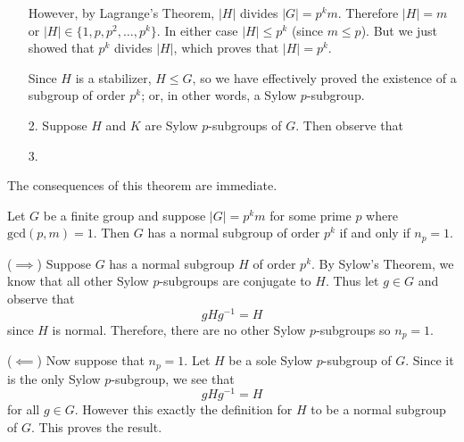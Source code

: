 \begin{prf}
\begin{itemize}
            However, by Lagrange's Theorem, $|H|$ divides $|G| =
            p^km$. Therefore $|H| = m$ or $|H| \in \{1, p, p^2, \dots,
            p^k\}$. In either case $|H| \le p^k$ (since $m \le p$).
            But we just showed that $p^k$ divides $|H|$, which proves
            that $|H| = p^k$. 
            
            Since $H$ is a stabilizer, $H \le G$, so
            we have effectively proved the existence of a subgroup of
            order $p^k$; or, in other words, a Sylow $p$-subgroup. 

        \item[2.]
            Suppose $H$ and $K$ are Sylow $p$-subgroups of $G$. 
            Then observe that 

        \item[3.] 
            


            
        \end{itemize}
    \end{prf}

    The consequences of this theorem are immediate. 
    \begin{proposition}\label{sylow_normal}
        Let $G$ be a finite group and suppose $|G| = p^km$ for some
        prime $p$ where $\mbox{gcd}(p, m) = 1$. Then $G$ has a normal
        subgroup of order $p^k$ if and only if $n_p = 1$.
    \end{proposition}

    \begin{prf}
        ($\implies$) Suppose $G$ has a normal subgroup $H$ of order $p^k$. By
        Sylow's Theorem, we know that all 
        other Sylow $p$-subgroups are conjugate to $H$. Thus let $g
        \in G$ and observe that 
        \[
            gHg^{-1} = H
        \]
        since $H$ is normal. Therefore, there are no other Sylow
        $p$-subgroups so $n_p = 1.$
        
        ($\impliedby$) Now suppose that $n_p = 1$. Let $H$ be a sole
        Sylow $p$-subgroup of $G$. Since it is the only Sylow
        $p$-subgroup, we see that 
        \[
            gHg^{-1} = H
        \]
         for all $g \in G$. However this exactly the definition for
         $H$ to be a normal subgroup of $G$. This proves the result.
    \end{prf}

